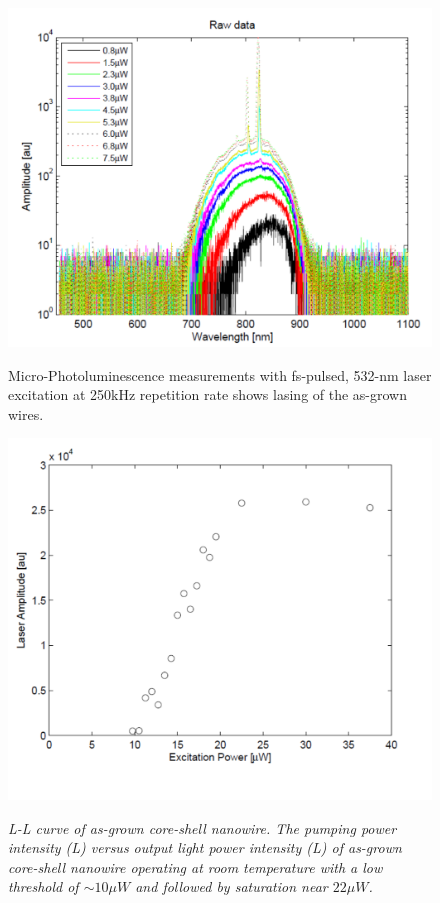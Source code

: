 \begin{figure}
  \caption{Micro-Photoluminescence measurements with fs-pulsed, 532-nm laser excitation at 250kHz repetition rate shows lasing of the as-grown wires.}
  \centering
  \includegraphics[width=\textwidth]{pictures/Data/lasing}
  \label{lasing}
\end{figure}

\begin{figure}
  \caption{\em{L-L curve of as-grown core-shell nanowire.} The pumping power intensity (L) versus output light power intensity (L) of as-grown core-shell nanowire operating at room temperature with a low threshold of $\sim10{\mu}W$ and followed by saturation near $22{\mu}W$.}
  \centering
  \includegraphics[width=\textwidth]{pictures/Data/expthreshold}
  \label{expthreshold}
\end{figure}
